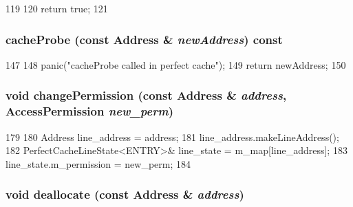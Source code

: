 \begin{DoxyCode}
119 {
120     return true;
121 }
\end{DoxyCode}
\hypertarget{classPerfectCacheMemory_aa9572469772de2df4793fa2108f5a4b9}{
\subsubsection[{cacheProbe}]{ cacheProbe (const {\bf Address} \& {\em newAddress}) const}}
\label{classPerfectCacheMemory_aa9572469772de2df4793fa2108f5a4b9}



\begin{DoxyCode}
147 {
148     panic("cacheProbe called in perfect cache");
149     return newAddress;
150 }
\end{DoxyCode}
\hypertarget{classPerfectCacheMemory_acc96bbc477102070290a19953eff77bc}{
\subsubsection[{changePermission}]{\setlength{\rightskip}{0pt plus 5cm}void changePermission (const {\bf Address} \& {\em address}, \/  AccessPermission {\em new\_\-perm})}}
\label{classPerfectCacheMemory_acc96bbc477102070290a19953eff77bc}



\begin{DoxyCode}
179 {
180     Address line_address = address;
181     line_address.makeLineAddress();
182     PerfectCacheLineState<ENTRY>& line_state = m_map[line_address];
183     line_state.m_permission = new_perm;
184 }
\end{DoxyCode}
\hypertarget{classPerfectCacheMemory_ad1a3e4943cc214363839148c7d94d6a4}{
\subsubsection[{deallocate}]{\setlength{\rightskip}{0pt plus 5cm}void deallocate (const {\bf Address} \& {\em address})}}
\label{classPerfectCacheMemory_ad1a3e4943cc214363839148c7d94d6a4}



